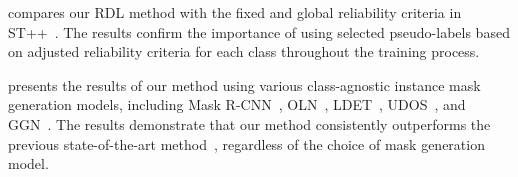 

 compares our RDL method with the fixed and global reliability criteria in ST++~\cite{yang2020superpixel}. The results confirm the importance of using selected pseudo-labels based on adjusted reliability criteria for each class throughout the training process.




 presents the results of our method using various class-agnostic instance mask generation models, including Mask R-CNN~\cite{he2017mask}, OLN~\cite{Kim2022Learning}, LDET~\cite{Saito2022Learning}, UDOS~\cite{kalluri2023open}, and GGN~\cite{wang2022open}. The results demonstrate that our method consistently outperforms the previous state-of-the-art method~\cite{fomenko2022learning}, regardless of the choice of mask generation model.








